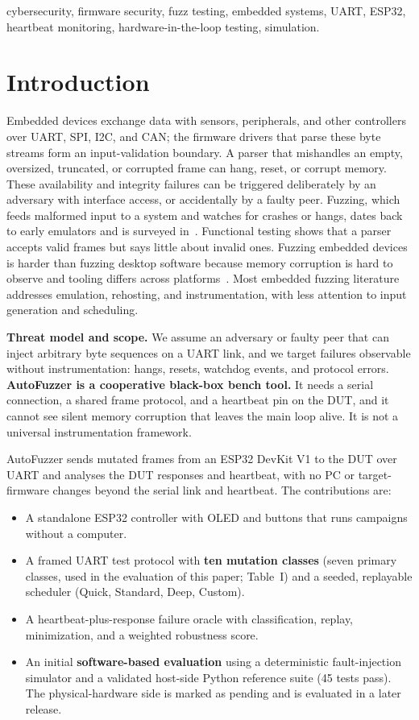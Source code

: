 \documentclass[10pt,letterpaper]{article}
\begin{document}
\begin{IEEEkeywords}
cybersecurity, firmware security, fuzz testing, embedded systems, UART, ESP32, heartbeat monitoring, hardware-in-the-loop testing, simulation.
\end{IEEEkeywords}

\section{Introduction}
Embedded devices exchange data with sensors, peripherals, and other controllers over UART, SPI, I2C, and CAN; the firmware drivers that parse these byte streams form an input-validation boundary. A parser that mishandles an empty, oversized, truncated, or corrupted frame can hang, reset, or corrupt memory. These availability and integrity failures can be triggered deliberately by an adversary with interface access, or accidentally by a faulty peer. Fuzzing, which feeds malformed input to a system and watches for crashes or hangs, dates back to early emulators and is surveyed in~\cite{miller1990empirical,manes2021art,zhang2025survey}. Functional testing shows that a parser accepts valid frames but says little about invalid ones. Fuzzing embedded devices is harder than fuzzing desktop software because memory corruption is hard to observe and tooling differs across platforms~\cite{muench2018what}. Most embedded fuzzing literature addresses emulation, rehosting, and instrumentation, with less attention to input generation and scheduling.

\textbf{Threat model and scope.} We assume an adversary or faulty peer that can inject arbitrary byte sequences on a UART link, and we target failures observable without instrumentation: hangs, resets, watchdog events, and protocol errors. \textbf{AutoFuzzer is a cooperative black-box bench tool.} It needs a serial connection, a shared frame protocol, and a heartbeat pin on the DUT, and it cannot see silent memory corruption that leaves the main loop alive. It is not a universal instrumentation framework.

AutoFuzzer sends mutated frames from an ESP32 DevKit V1 to the DUT over UART and analyses the DUT responses and heartbeat, with no PC or target-firmware changes beyond the serial link and heartbeat. The contributions are:
\begin{itemize}
  \item A standalone ESP32 controller with OLED and buttons that runs campaigns without a computer.
  \item A framed UART test protocol with \textbf{ten mutation classes} (seven primary classes, used in the evaluation of this paper; Table~I) and a seeded, replayable scheduler (Quick, Standard, Deep, Custom).
  \item A heartbeat-plus-response failure oracle with classification, replay, minimization, and a weighted robustness score.
  \item An initial \textbf{software-based evaluation} using a deterministic fault-injection simulator and a validated host-side Python reference suite (45 tests pass). The physical-hardware side is marked as pending and is evaluated in a later release.
\end{itemize}
\end{document}
